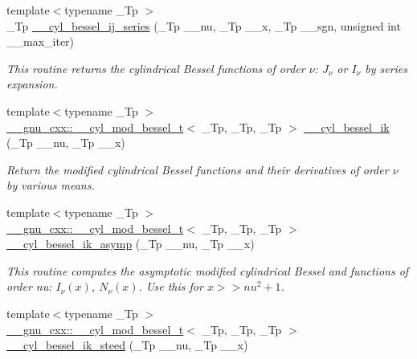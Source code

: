 \begin{DoxyCompactItemize}
{\footnotesize template$<$typename \+\_\+\+Tp $>$ }\\\+\_\+\+Tp \hyperlink{namespacestd_1_1____detail_a8b52f1f93a90b9ed2504521e0ea440f5}{\+\_\+\+\_\+cyl\+\_\+bessel\+\_\+ij\+\_\+series} (\+\_\+\+Tp \+\_\+\+\_\+nu, \+\_\+\+Tp \+\_\+\+\_\+x, \+\_\+\+Tp \+\_\+\+\_\+sgn, unsigned int \+\_\+\+\_\+max\+\_\+iter)
\begin{DoxyCompactList}\small\item\em This routine returns the cylindrical Bessel functions of order $ \nu $\+: $ J_{\nu} $ or $ I_{\nu} $ by series expansion. \end{DoxyCompactList}\item 
{\footnotesize template$<$typename \+\_\+\+Tp $>$ }\\\hyperlink{struct____gnu__cxx_1_1____cyl__mod__bessel__t}{\+\_\+\+\_\+gnu\+\_\+cxx\+::\+\_\+\+\_\+cyl\+\_\+mod\+\_\+bessel\+\_\+t}$<$ \+\_\+\+Tp, \+\_\+\+Tp, \+\_\+\+Tp $>$ \hyperlink{namespacestd_1_1____detail_a9ada6640e605fc21b12191e651e39de1}{\+\_\+\+\_\+cyl\+\_\+bessel\+\_\+ik} (\+\_\+\+Tp \+\_\+\+\_\+nu, \+\_\+\+Tp \+\_\+\+\_\+x)
\begin{DoxyCompactList}\small\item\em Return the modified cylindrical Bessel functions and their derivatives of order $ \nu $ by various means. \end{DoxyCompactList}\item 
{\footnotesize template$<$typename \+\_\+\+Tp $>$ }\\\hyperlink{struct____gnu__cxx_1_1____cyl__mod__bessel__t}{\+\_\+\+\_\+gnu\+\_\+cxx\+::\+\_\+\+\_\+cyl\+\_\+mod\+\_\+bessel\+\_\+t}$<$ \+\_\+\+Tp, \+\_\+\+Tp, \+\_\+\+Tp $>$ \hyperlink{namespacestd_1_1____detail_a9f88b1d2b4158cc854a91a5ae7b4168d}{\+\_\+\+\_\+cyl\+\_\+bessel\+\_\+ik\+\_\+asymp} (\+\_\+\+Tp \+\_\+\+\_\+nu, \+\_\+\+Tp \+\_\+\+\_\+x)
\begin{DoxyCompactList}\small\item\em This routine computes the asymptotic modified cylindrical Bessel and functions of order nu\+: $ I_{\nu}(x) $, $ N_{\nu}(x) $. Use this for $ x >> nu^2 + 1 $. \end{DoxyCompactList}\item 
{\footnotesize template$<$typename \+\_\+\+Tp $>$ }\\\hyperlink{struct____gnu__cxx_1_1____cyl__mod__bessel__t}{\+\_\+\+\_\+gnu\+\_\+cxx\+::\+\_\+\+\_\+cyl\+\_\+mod\+\_\+bessel\+\_\+t}$<$ \+\_\+\+Tp, \+\_\+\+Tp, \+\_\+\+Tp $>$ \hyperlink{namespacestd_1_1____detail_a0995aa3ea71e25f413e73c07f6b47542}{\+\_\+\+\_\+cyl\+\_\+bessel\+\_\+ik\+\_\+steed} (\+\_\+\+Tp \+\_\+\+\_\+nu, \+\_\+\+Tp \+\_\+\+\_\+x)

\end{DoxyCompactItemize}
